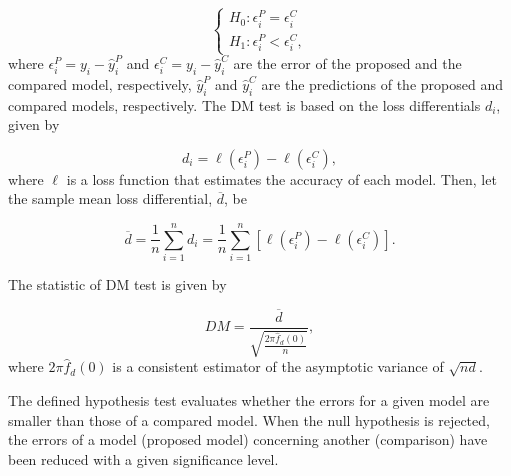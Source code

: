 \begin{equation}
    \begin{cases}
    \displaystyle  H_{0}: \epsilon^{P}_{i} = \epsilon^{C}_{i} \\
    \displaystyle  H_{1}: \epsilon^{P}_{i} < \epsilon^{C}_{i},
    \end{cases}
    \label{eq:DMH}
\end{equation}
where $\epsilon_{i}^{P} = y_i - \hat{y}_i^P$ and $\epsilon_{i}^{C} = y_i - \hat{y}_i^C$ are the error of the proposed and the compared model, respectively, $\hat{y}_i^P$ and $\hat{y}_i^C$ are the predictions of the proposed and compared models, respectively. The \ac{DM} test is based on the loss differentials $d_i$, given by

\begin{equation}
    d_i=\ell (\epsilon_{i}^P) - \ell (\epsilon_{i}^C),
    \label{eq:dmloss}
\end{equation}
where $\ell$ is a loss function that estimates the accuracy of each model. Then, let the sample mean loss differential, $\overline{d}$, be

\begin{equation}
    \overline{d} = 
    \frac{1}{n} \displaystyle \sum_{i=1}^{n} d_i =
    \frac{1}{n} \displaystyle \sum_{i=1}^{n} \left[ \ell (\epsilon_{i}^P) - \ell (\epsilon_{i}^C) \right].
    \label{eq:meanloss}
\end{equation}

The statistic of \ac{DM} test is given by

\begin{equation}
DM = \frac{\overline{d}}{\sqrt{\frac{2\pi\hat{f}_d(0)}{n}}}, \label{eq:DMS}
\end{equation}
where $2\pi\hat{f}_d(0)$ is a consistent estimator of the asymptotic variance of $\sqrt{nd}$.

The defined hypothesis test evaluates whether the errors for a given model are smaller than those of a compared model. When the null hypothesis is rejected, the errors of a model (proposed model) concerning another (comparison) have been reduced with a given significance level.